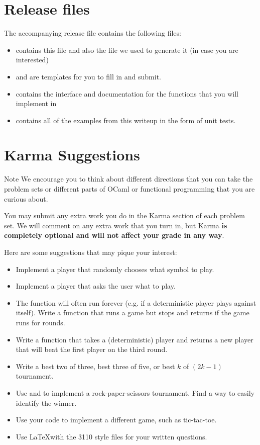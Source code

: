 \documentclass{pset}
\begin{document}
\section*{Release files}

The accompanying release file  contains the following files:
\begin{itemize}
\item {} contains this file and also the  file
      we used to generate it (in case you are interested)
\item {} and  are templates for
      you to fill in and submit.
\item {} contains the interface and documentation for the
      functions that you will implement in 
\item {} contains all of the examples from this writeup in
      the form of unit tests.
\end{itemize}

\newpage{}
\section*{Karma Suggestions}

\begin{note}{Note}
We encourage you to think about different directions that you can take
the problem sets or different parts of OCaml or functional programming
that you are curious about.

You may submit any extra work you do in the Karma section of each
problem set.  We will comment on any extra work that you turn in, but
Karma \textbf{is completely optional and will not affect your grade in
any way}.
\end{note}

Here are some suggestions that may pique your interest:
\begin{itemize}
\item{} Implement a player that randomly chooses what symbol to play.
\item{} Implement a player that asks the user what to play.
\item{} The  function will often run forever (e.g. if a deterministic player
      plays against itself).  Write a function that runs a game but stops and
      returns  if the game runs for  rounds.
\item{} Write a function that takes a (deterministic) player and returns a new
      player that will beat the first player on the third round.
\item{} Write a best two of three, best three of five, or best $k$ of $(2k - 1)$
      tournament.
\item{} Use  and  to implement a
  rock-paper-scissors tournament.  Find a way to easily identify the
  winner.
\item{} Use your code to implement a different game, such as tic-tac-toe.
\item{} Use \LaTeX with the 3110 style files for your written questions.
\end{itemize}
\end{document}
